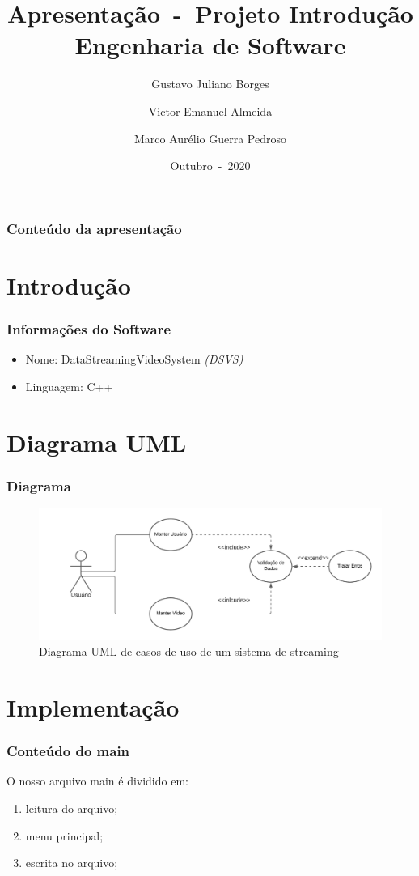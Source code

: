 \documentclass{beamer}
\author{Gustavo Juliano Borges \and Victor Emanuel Almeida \and Marco Aurélio Guerra Pedroso}
\title{Apresentação~-~Projeto Introdução Engenharia de Software}
\date{Outubro~-~2020}
\begin{document}
	\frame{\titlepage}

	\begin{frame}
		\frametitle{Conteúdo da apresentação}
		\tableofcontents
	\end{frame}

	\section{Introdução}
	\begin{frame}
		\frametitle{Informações do Software}
		\begin{itemize}
			\item Nome: DataStreamingVideoSystem \textit{(DSVS)}
			\item Linguagem: C++
		\end{itemize}
	\end{frame}

	\section{Diagrama UML}
	\begin{frame}
		\frametitle{Diagrama}
		\begin{figure}[!htb]
			\centering
			\includegraphics[scale=.5]{images/DiagramaUML.png}
			\caption{\label{fig:}Diagrama UML de casos de uso de um sistema de streaming}
		\end{figure}
	\end{frame}

	\section{Implementação}
	\begin{frame}
		\frametitle{Conteúdo do main}
		O nosso arquivo main é dividido em:
		\begin{enumerate}
			\item leitura do arquivo;
			\item menu principal;
			\item escrita no arquivo;
		\end{enumerate}
	\end{frame}
\end{document}

